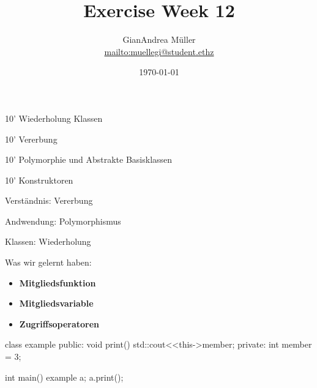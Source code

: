 \ifnum\conditionmacro=1 \documentclass[handout,usenames,dvipsnames]{beamer}\fi
\title{Exercise Week 12}
\author{GianAndrea Müller\\ \url{mailto:muellegi@student.ethz}}
\date{\today}
\begin{document}
\maketitle

\begin{TFTimeSchedule}
\item 10' Wiederholung Klassen
\item 10' Vererbung
\item 10' Polymorphie und Abstrakte Basisklassen
\item 10' Konstruktoren
\end{TFTimeSchedule}

\begin{TFLearningObjectives}
\item Verständnis: Vererbung
\item Andwendung: Polymorphismus
\end{TFLearningObjectives}

\begin{frame}[fragile]{Klassen: Wiederholung}
\begin{block}{Was wir gelernt haben:}
\begin{itemize}
\item \textbf{Mitgliedsfunktion}
\item \textbf{Mitgliedsvariable}
\item \textbf{Zugriffsoperatoren}
\end{itemize}
\end{block}

\begin{TPCpp}
class example {
public:
	void print() {std::cout<<this->member;}
private:
	int member = 3;
}

int main(){
	example a;
	a.print();
}
\end{TPCpp}
\end{frame}

\end{document}
